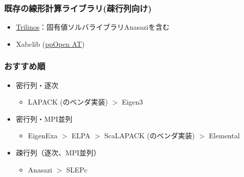 \begin{frame}
  \frametitle{既存の線形計算ライブラリ(疎行列向け)}
  \begin{itemize}
  \item \href{http://trilinos.org}{Trilinos}：固有値ソルバライブラリAnasaziを含む
  \item Xabclib (\href{http://ppopenhpc.cc.u-tokyo.ac.jp/}{ppOpen AT})
  \end{itemize}
\end{frame}

\begin{frame}
  \frametitle{おすすめ順}
  \begin{itemize}
  \item 密行列・逐次
    \begin{itemize}
      \item LAPACK (のベンダ実装) $>$ Eigen3
    \end{itemize}
  \item 密行列・MPI並列
    \begin{itemize}
      \item EigenExa $>$ ELPA $>$ ScaLAPACK (のベンダ実装) $>$ Elemental
    \end{itemize}
  \item 疎行列（逐次、MPI並列）
    \begin{itemize}
      \item Anasazi $>$ SLEPc
    \end{itemize}
  \end{itemize}
\end{frame}

